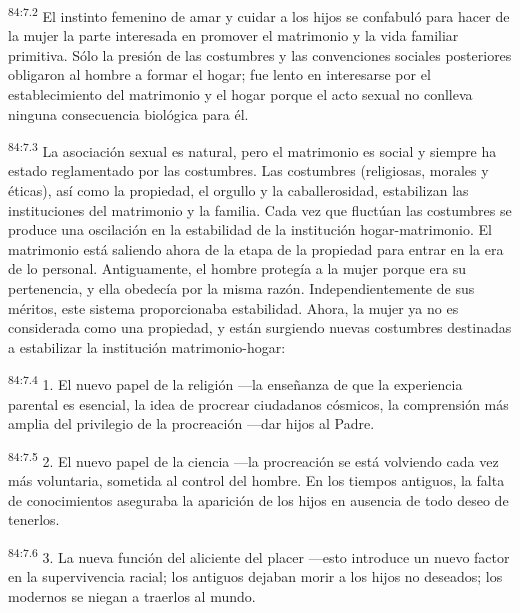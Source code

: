 \par
\textsuperscript{84:7.2} El instinto femenino de amar y cuidar a los hijos se confabuló para hacer de la mujer la parte interesada en promover el matrimonio y la vida familiar primitiva. Sólo la presión de las costumbres y las convenciones sociales posteriores obligaron al hombre a formar el hogar; fue lento en interesarse por el establecimiento del matrimonio y el hogar porque el acto sexual no conlleva ninguna consecuencia biológica para él.

\par
\textsuperscript{84:7.3} La asociación sexual es natural, pero el matrimonio es social y siempre ha estado reglamentado por las costumbres. Las costumbres (religiosas, morales y éticas), así como la propiedad, el orgullo y la caballerosidad, estabilizan las instituciones del matrimonio y la familia. Cada vez que fluctúan las costumbres se produce una oscilación en la estabilidad de la institución hogar-matrimonio. El matrimonio está saliendo ahora de la etapa de la propiedad para entrar en la era de lo personal. Antiguamente, el hombre protegía a la mujer porque era su pertenencia, y ella obedecía por la misma razón. Independientemente de sus méritos, este sistema proporcionaba estabilidad. Ahora, la mujer ya no es considerada como una propiedad, y están surgiendo nuevas costumbres destinadas a estabilizar la institución matrimonio-hogar:

\par
\textsuperscript{84:7.4} 1. El nuevo papel de la religión ---la enseñanza de que la experiencia parental es esencial, la idea de procrear ciudadanos cósmicos, la comprensión más amplia del privilegio de la procreación ---dar hijos al Padre.

\par
\textsuperscript{84:7.5} 2. El nuevo papel de la ciencia ---la procreación se está volviendo cada vez más voluntaria, sometida al control del hombre. En los tiempos antiguos, la falta de conocimientos aseguraba la aparición de los hijos en ausencia de todo deseo de tenerlos.

\par
\textsuperscript{84:7.6} 3. La nueva función del aliciente del placer ---esto introduce un nuevo factor en la supervivencia racial; los antiguos dejaban morir a los hijos no deseados; los modernos se niegan a traerlos al mundo.

